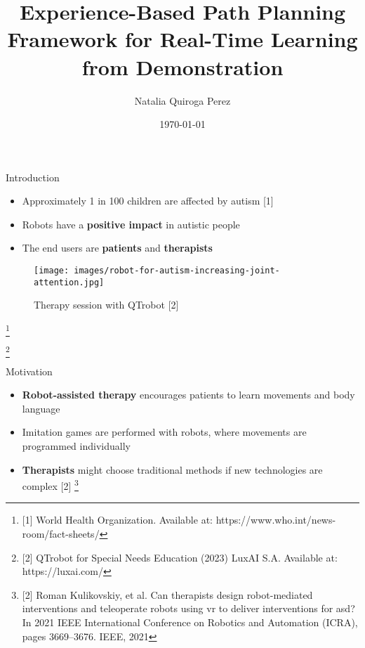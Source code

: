 \documentclass[aspectratio=169]{beamer}
\author[Natalia Quiroga]{Natalia Quiroga Perez}
\title[Experience-Based Path Planning Framework for Real-Time LfD]{Experience-Based Path Planning Framework for Real-Time Learning from Demonstration}
\institute[HBRS]{Hochschule Bonn-Rhein-Sieg}
\date{\today}
\newcommand\blfootnote[1]{%
	\begingroup
	\renewcommand\thefootnote{}\footnote{#1}%
	\addtocounter{footnote}{-1}%
	\endgroup
}
\begin{document}
{
\begin{frame}
\titlepage
\end{frame}
}

 \begin{frame}{Introduction}
	\begin{minipage}{0.5\linewidth}
	\begin{itemize}
		\item Approximately 1 in 100 children are affected by autism [1]
		\newline
		\item Robots have a \textcolor{hbrsblue}{\textbf{positive impact}} in autistic people
		\newline
		\item The end users are \textcolor{hbrsblue}{\textbf{patients}} and \textcolor{hbrsblue}{\textbf{therapists}}
	\end{itemize}
\end{minipage}\hfill	
\begin{minipage}{0.5\linewidth}
	\begin{figure}[tp]
		\centering
		\texttt{[image: images/robot-for-autism-increasing-joint-attention.jpg]}
		\caption{Therapy session with QTrobot [2]}
		\label{fig:robot-for-autism-increasing-joint-attention}
	\end{figure}	
\end{minipage}

\vspace{-0.5cm}
\blfootnote{[1] World Health Organization. Available at: https://www.who.int/news-room/fact-sheets/}
\blfootnote{[2] QTrobot for Special Needs Education (2023) LuxAI S.A. Available at: https://luxai.com/}
\end{frame}

\begin{frame}{Motivation}
	\begin{itemize}
		\item \textcolor{hbrsblue}{\textbf{Robot-assisted therapy}} encourages patients to learn movements and body language
		\newline
		\item Imitation games are performed with robots, where movements are programmed individually
		\newline
		\item \textcolor{hbrsblue}{\textbf{Therapists}} might choose traditional methods if new technologies are complex [2] \blfootnote{[2] Roman Kulikovskiy, et al. Can therapists design robot-mediated interventions and teleoperate robots using vr to deliver interventions for asd? In 2021 IEEE International Conference on Robotics and Automation (ICRA), pages 3669–3676. IEEE, 2021}
	\end{itemize}
\end{frame}
\end{document}
